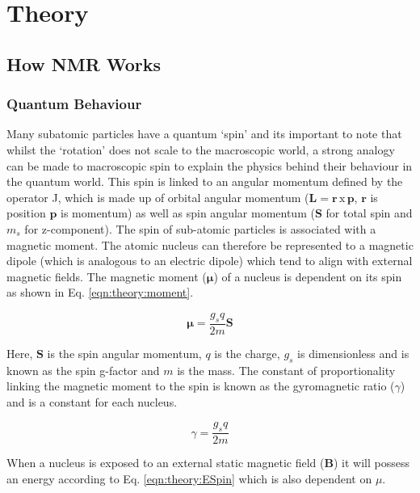 \chapter{Theory}
\label{Chap:Theory}

\section{How \ac{NMR} Works}
\subsection{Quantum Behaviour}

Many subatomic particles have a quantum `spin' and its important to note that whilst the `rotation' does not scale to the macroscopic world, a strong analogy can be made to macroscopic spin to explain the physics behind their behaviour in the quantum world. This spin is linked to an angular momentum defined by the operator J, which is made up of orbital angular momentum ($\mathbf{L} = \mathbf{r}\, \textrm{x} \, \mathbf{p}$, $\mathbf{r}$ is position $\mathbf{p}$ is momentum) as well as spin angular momentum ($\mathbf{S}$ for total spin and $m_s$ for z-component). The spin of sub-atomic particles is associated with a magnetic moment. The atomic nucleus can therefore be represented to a magnetic dipole (which is analogous to an electric dipole) which tend to align with external magnetic fields. The magnetic moment ($\mathbf{\mu}$) of a nucleus is dependent on its spin as shown in Eq. \ref{eqn:theory:moment}.

\begin{equation}
    \mathbf{\mu} = \frac{g_sq}{2m} \mathbf{S}
    \label{eqn:theory:moment}
\end{equation}

Here, $\mathbf{S}$ is the spin angular momentum, $q$ is the charge, $g_s$ is dimensionless and is known as the spin g-factor and $m$ is the mass. The constant of proportionality linking the magnetic moment to the spin is known as the gyromagnetic ratio ($\gamma$) and is a constant for each nucleus. 

\begin{equation}
    \gamma = \frac{g_sq}{2m}
    \label{eqn:theory:gyro}
\end{equation}

When a nucleus is exposed to an external static magnetic field ($\mathbf{B}$) it will possess an energy according to Eq. \ref{eqn:theory:ESpin} which is also dependent on $\mu$.

